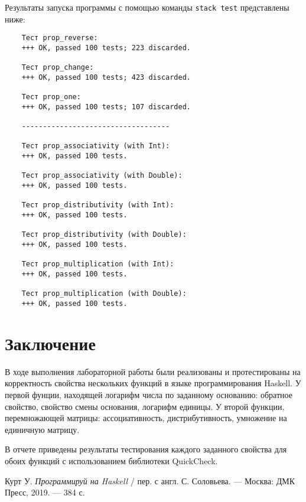\documentclass[10pt,a4paper,final]{article} %
\begin{document}
Результаты запуска программы с помощью команды \texttt{stack test} представлены ниже:
\begin{lstlisting} 
	Тест prop_reverse:
	+++ OK, passed 100 tests; 223 discarded.
	
	Тест prop_change:
	+++ OK, passed 100 tests; 423 discarded.
	
	Тест prop_one:
	+++ OK, passed 100 tests; 107 discarded.
	
	-----------------------------------
	
	Тест prop_associativity (with Int):
	+++ OK, passed 100 tests.
	
	Тест prop_associativity (with Double):
	+++ OK, passed 100 tests.
	
	Тест prop_distributivity (with Int):
	+++ OK, passed 100 tests.
	
	Тест prop_distributivity (with Double):
	+++ OK, passed 100 tests.
	
	Тест prop_multiplication (with Int):
	+++ OK, passed 100 tests.
	
	Тест prop_multiplication (with Double):
	+++ OK, passed 100 tests.
\end{lstlisting}



\newpage
\section* {Заключение}


В ходе выполнения лабораторной работы были реализованы и протестированы на корректность свойства нескольких функций в языке программирования Haskell. У первой фунции, находящей логарифм числа по заданному основанию: обратное свойство, свойство смены основания,  логарифм единицы. У второй функции, перемножающей матрицы: ассоциативность, дистрибутивность, умножение на единичную матрицу.

В отчете приведены результаты тестирования каждого заданного свойства для обоих функций с использованием библиотеки QuickCheck.




\newpage

\begin{thebibliography}{99}
	
	Курт У. \textit{Программируй на Haskell} / пер. с англ. С. Соловьева. — Москва: ДМК Пресс, 2019. — 384 с.
	

\end{thebibliography}

\end{document}
